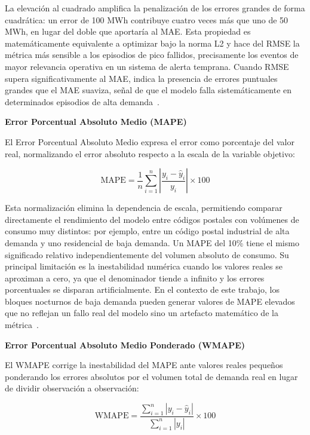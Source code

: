 \documentclass[12pt, a4paper]{article}
\begin{document}
La elevación al cuadrado amplifica la penalización de los errores grandes de forma cuadrática: un error de 100 MWh contribuye cuatro veces más que uno de 50 MWh, en lugar del doble que aportaría al MAE. Esta propiedad es matemáticamente equivalente a optimizar bajo la norma L2 y hace del RMSE la métrica más sensible a los episodios de pico fallidos, precisamente los eventos de mayor relevancia operativa en un sistema de alerta temprana. Cuando RMSE supera significativamente al MAE, indica la presencia de errores puntuales grandes que el MAE suaviza, señal de que el modelo falla sistemáticamente en determinados episodios de alta demanda~\cite{gassar2024, rubattu2023}.

\textbf{Error Porcentual Absoluto Medio (MAPE)}

El Error Porcentual Absoluto Medio expresa el error como porcentaje del valor real, normalizando el error absoluto respecto a la escala de la variable objetivo:

\begin{equation}
\text{MAPE} = \frac{1}{n} \sum_{i=1}^{n} \left| \frac{y_i - \hat{y}_i}{y_i} \right| \times 100
\end{equation}

Esta normalización elimina la dependencia de escala, permitiendo comparar directamente el rendimiento del modelo entre códigos postales con volúmenes de consumo muy distintos: por ejemplo, entre un código postal industrial de alta demanda y uno residencial de baja demanda. Un MAPE del 10\% tiene el mismo significado relativo independientemente del volumen absoluto de consumo. Su principal limitación es la inestabilidad numérica cuando los valores reales se aproximan a cero, ya que el denominador tiende a infinito y los errores porcentuales se disparan artificialmente. En el contexto de este trabajo, los bloques nocturnos de baja demanda pueden generar valores de MAPE elevados que no reflejan un fallo real del modelo sino un artefacto matemático de la métrica~\cite{gassar2024, rubattu2023}.

\textbf{Error Porcentual Absoluto Medio Ponderado (WMAPE)}

El WMAPE corrige la inestabilidad del MAPE ante valores reales pequeños ponderando los errores absolutos por el volumen total de demanda real en lugar de dividir observación a observación:

\begin{equation}
\text{WMAPE} = \frac{\sum_{i=1}^{n} |y_i - \hat{y}_i|}{\sum_{i=1}^{n} |y_i|} \times 100
\end{equation}
\end{document}
